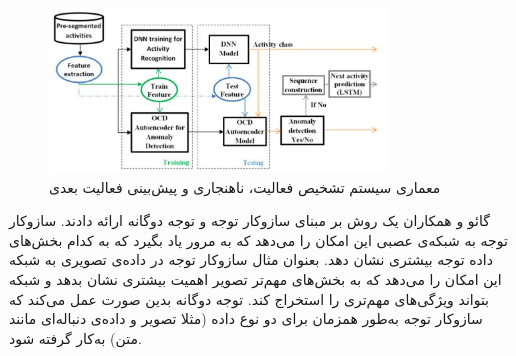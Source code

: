 \begin{figure}[htbp]
  \centering
  \includegraphics[width=0.8\textwidth]{Images/Chapter2/alaghbari-framework.png}
  \caption{معماری سیستم تشخیص فعالیت، ناهنجاری و پیش‌بینی فعالیت بعدی}
  \label{fig:alaghbari-framework}
\end{figure}

گائو و همکاران\cite{gao2021danhar}
یک روش بر مبنای سازوکار توجه
و توجه دوگانه
ارائه دادند. سازوکار توجه به شبکه‌ی عصبی این امکان را می‌دهد که به مرور یاد بگیرد که به کدام بخش‌های داده توجه بیشتری نشان دهد. بعنوان مثال سازوکار توجه در داده‌ی تصویری به شبکه این امکان را می‌دهد که به بخش‌های مهم‌تر تصویر اهمیت بیشتری نشان بدهد و شبکه بتواند ویژگی‌های مهم‌تری را استخراج کند. توجه دوگانه بدین صورت عمل می‌کند که سازوکار توجه به‌طور همزمان برای دو نوع داده (مثلا تصویر و داده‌ی دنباله‌ای مانند متن) به‌کار گرفته شود.

